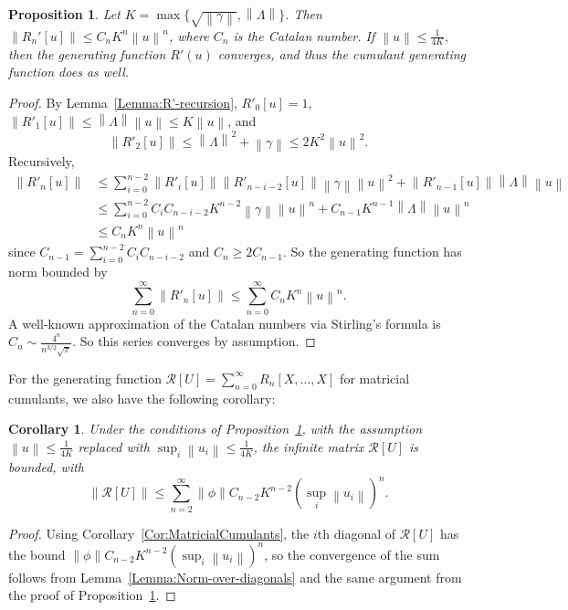 \documentclass[12pt]{amsart}
\newtheorem{Cor}[Thm]{Corollary}
\newtheorem{Prop}[Thm]{Proposition}
\theoremstyle{definition}
\newcommand{\mc}[1]{\mathcal{#1}}
\newcommand{\norm}[1]{\left \|{#1} \right \|}
\begin{document}
\begin{Prop}\label{Prop:CGF-Convergence}
	Let $K = \max\{\sqrt{\norm{\gamma}}, \norm{\Lambda}\}$. Then $\norm{R_n'[u]} \leq C_n K^n \norm{u}^n$, where $C_n$ is the Catalan number. If $\norm{u}\leq \frac{1}{4K}$, then the generating function $R'(u)$ converges, and thus the cumulant generating function does as well.
\end{Prop}
\begin{proof}
	By Lemma~\ref{Lemma:R'-recursion}, $R'_0 [u] = 1$, $\norm{R'_1[u]} \leq \norm{\Lambda}\norm{u} \leq K \norm{u}$, and
\[
\norm{R'_2[u]} \leq \norm{\Lambda}^2 + \norm{\gamma} \leq 2 K^2 \norm{u}^2.
\]
Recursively,
	\begin{equation*}
\label{Eq:RPrimeNorm}
\begin{split}
	\norm{R'_n[u]} & \leq \sum_{i=0}^{n-2} \norm{R'_i[u]}\norm{R'_{n-i-2}[u]}\norm{\gamma}\norm{u}^2 + \norm{R'_{n-1}[u]}\norm{\Lambda}\norm{u} \\
& \leq \sum_{i=0}^{n-2} C_i C_{n-i-2} K^{n-2} \norm{\gamma} \norm{u}^n + C_{n-1} K^{n-1} \norm{\Lambda} \norm{u}^n \\
& \leq C_n K^n \norm{u}^n
\end{split}
	\end{equation*}
since $C_{n-1} = \sum_{i=0}^{n-2} C_i C_{n-i-2}$ and $C_n \geq 2 C_{n-1}$. So the generating function has norm bounded by
	\begin{equation*}
		\sum_{n=0}^\infty \norm{R'_n[u]} \leq \sum_{n=0}^\infty C_n K^n \norm{u}^n.
	\end{equation*}
A well-known approximation of the Catalan numbers via Stirling's formula is $C_n \sim \frac{4^n}{n^{3/2}\sqrt{\pi}}$. So this series converges by assumption.
\end{proof}


For the generating function $\mc{R}[U] = \sum_{n=0}^{\infty} R_n[X, ..., X]$ for matricial cumulants, we also have the following corollary:

\begin{Cor}
\label{Cor:Norm-cumulant-GF}
Under the conditions of Proposition~\ref{Prop:CGF-Convergence}, with the assumption $\norm{u}\leq \frac{1}{4K}$ replaced with $\sup_{i}\norm{u_i} \leq \frac{1}{4K}$, the infinite matrix $\mc{R}[U]$ is bounded, with
\begin{equation}
\norm{\mc{R}[U]} \leq \sum_{n=2}^{\infty} \norm{\phi} C_{n-2} K^{n-2} \left(\sup_i \norm{u_i}\right)^n .
\end{equation}
\end{Cor}
\begin{proof}
Using Corollary~\ref{Cor:MatricialCumulants}, the $i$th diagonal of $\mc{R}[U]$ has the bound $\norm{\phi} C_{n-2} K^{n-2} \left(\sup_i \norm{u_i}\right)^n$, so the convergence of the sum follows from Lemma~\ref{Lemma:Norm-over-diagonals} and the same argument from the proof of Proposition~\ref{Prop:CGF-Convergence}.
\end{proof}
\end{document}
